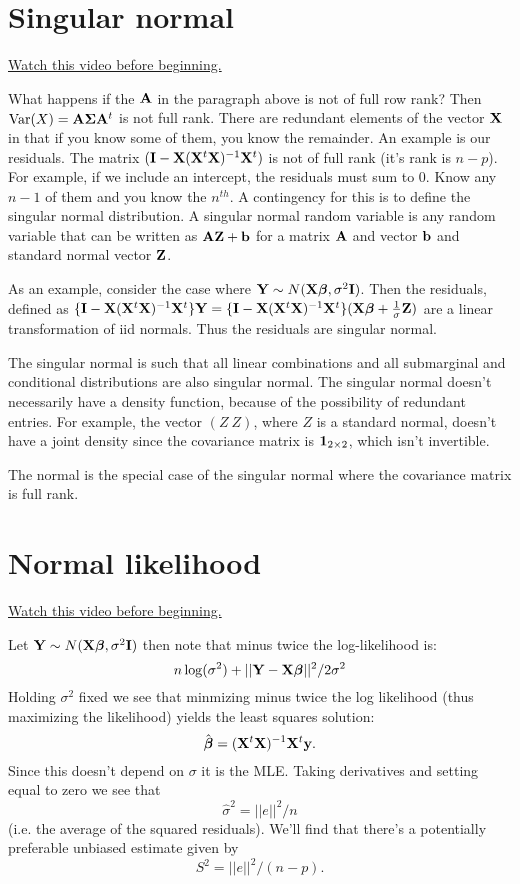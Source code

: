 \section{Singular normal}
\href{https://www.youtube.com/watch?v=JGoX7lokhyc&index=45&list=PLpl-gQkQivXhdgUCdaUQcdb31CRe8Mm2y}{Watch this video before beginning.}

What happens if the $\mathbf{A}$ in the paragraph above is not of full
row rank? Then $\mbox{Var}(X) = \mathbf{A}\boldsymbol{\Sigma} \mathbf{A}^t$ is not full rank.
There are redundant elements of the vector $\mathbf{X}$ in that if
you know some of them, you know the remainder. An example is
our residuals. The matrix $(\mathbf{I} - \mathbf{X} (\mathbf{X}^t \mathbf{X})^{-1} \mathbf{X}^t)$ is not of full
rank (it's rank is $n-p$). For example, if we include an
intercept, the residuals must sum to 0. Know any $n-1$ of
them and you know the $n^{th}$. A contingency for this
is to define the singular normal distribution. A
singular normal random variable is any random variable
that can be written as $\mathbf{A} \mathbf{Z} + \mathbf{b}$ for a matrix $\mathbf{A}$
and vector $\mathbf{b}$ and standard normal vector $\mathbf{Z}$. 

As an example, consider the case where $\mathbf{Y} \sim N(\mathbf{X} \boldsymbol{\beta}, \sigma^2 \mathbf{I})$.
Then the residuals, defined as $\{\mathbf{I} - \mathbf{X} (\mathbf{X}^t \mathbf{X})^{-1} \mathbf{X}^t\} \mathbf{Y} = \{\mathbf{I} - \mathbf{X} (\mathbf{X}^t \mathbf{X})^{-1} \mathbf{X}^t\}(\mathbf{X}\boldsymbol{\beta} + \frac{1}{\sigma} \mathbf{Z})$
are a linear transformation of iid normals. Thus the residuals are singular normal. 

The singular normal is such that all linear combinations and all submarginal and conditional distributions
are also singular normal. The singular normal doesn't necessarily
have a density function, because of the possibility of redundant
entries. For example, the vector $(Z ~ Z)$, where $Z$ is a standard normal,
doesn't have a joint density since the covariance matrix is $\mathbf{1}_{2\times 2}$,
which isn't invertible.

The normal is the special case of the singular normal where the covariance
matrix is full rank. 

\section{Normal likelihood}

\href{https://www.youtube.com/watch?v=HqlMCQwvjYw&list=PLpl-gQkQivXhdgUCdaUQcdb31CRe8Mm2y&index=46}{Watch this video before beginning.}

Let $\mathbf{Y} \sim N(\mathbf{X} \boldsymbol{\beta}, \sigma^2 \mathbf{I})$ then note that 
minus twice the log-likelihood is:
$$
n\log(\sigma^2) + ||\mathbf{Y} - \mathbf{X} \boldsymbol{\beta}||^2 / 2\sigma^2
$$
Holding $\sigma^2$ fixed we see that minmizing minus twice
the log likelihood (thus maximizing the likelihood) yields
the least squares solution:
$$
\hat {\boldsymbol{\beta}} = (\mathbf{X}^t \mathbf{X})^{-1} \mathbf{X}^t \mathbf{y}.
$$
Since this doesn't depend on $\sigma$ it is the MLE. 
Taking derivatives and setting equal to zero we
see that 
$$
\hat \sigma^2 = ||e||^2 / n
$$
(i.e. the average of the squared residuals). We'll
find that there's a potentially preferable unbiased
estimate given by
$$
S^2 = ||e||^2 / (n - p).
$$

